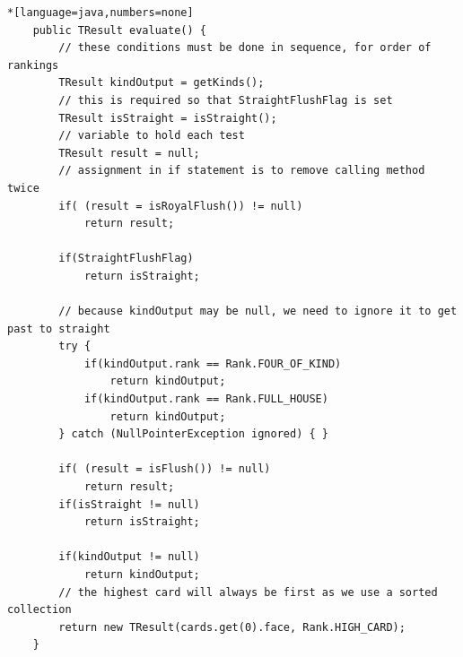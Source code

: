 \documentclass[11pt]{article}
\begin{document}
\begin{lstlisting}*[language=java,numbers=none]
    public TResult evaluate() {
        // these conditions must be done in sequence, for order of rankings
        TResult kindOutput = getKinds();
        // this is required so that StraightFlushFlag is set
        TResult isStraight = isStraight();
        // variable to hold each test
        TResult result = null;
        // assignment in if statement is to remove calling method twice
        if( (result = isRoyalFlush()) != null)
            return result;

        if(StraightFlushFlag)
            return isStraight;

        // because kindOutput may be null, we need to ignore it to get past to straight
        try {
            if(kindOutput.rank == Rank.FOUR_OF_KIND)
                return kindOutput;
            if(kindOutput.rank == Rank.FULL_HOUSE)
                return kindOutput;
        } catch (NullPointerException ignored) { }

        if( (result = isFlush()) != null)
            return result;
        if(isStraight != null)
            return isStraight;
       
        if(kindOutput != null)
            return kindOutput;
        // the highest card will always be first as we use a sorted collection
        return new TResult(cards.get(0).face, Rank.HIGH_CARD);
    }
\end{lstlisting}


\newpage
\end{document}
